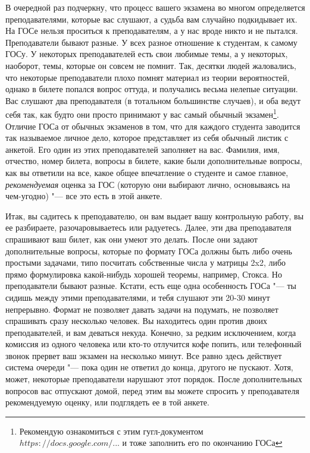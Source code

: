 В очередной раз подчеркну, что процесс вашего экзамена во многом определяется преподавателями, которые вас слушают, а судьба вам случайно подкидывает их. На ГОСе нельзя проситься к преподавателям, а у нас вроде никто и не пытался. Преподаватели бывают разные. У всех разное отношение к студентам, к самому ГОСу. У некоторых преподавателей есть свои любимые темы, а у некоторых, наоборот, темы, которые он совсем не помнит. Так, десятки людей жаловались, что некоторые преподаватели плохо помнят материал из теории вероятностей, однако в билете попался вопрос оттуда, и получались весьма нелепые ситуации. Вас слушают два преподавателя (в тотальном большинстве случаев), и оба ведут себя так, как будто они просто принимают у вас самый обычный экзамен\footnote{Рекомендую ознакомиться с этим гугл-документом \href{https://docs.google.com/spreadsheets/d/10jIg9Nr5oM1-Zjo_iIlKs8uxrBKrzfuJNas_YJIIxPs/edit\#gid=0}{$https://docs.google.com/...$} и тоже заполнить его по окончанию ГОСа}. Отличие ГОСа от обычных экзаменов в том, что для каждого студента заводится так называемое личное дело, которое представляет из себя обычный листик с анкетой. Его один из этих преподавателей заполняет на вас. Фамилия, имя, отчество, номер билета, вопросы в билете, какие были дополнительные вопросы, как вы ответили на все, какое общее впечатление о студенте и самое главное, \textit{рекомендуемая} оценка за ГОС (которую они выбирают лично, основываясь на чем-угодно) "--- все это есть в этой анкете. 

Итак, вы садитесь к преподавателю, он вам выдает вашу контрольную работу, вы ее разбираете, разочаровываетесь или радуетесь. Далее, эти два преподавателя спрашивают ваш билет, как они умеют это делать. После они задают дополнительные вопросы, которые по формату ГОСа должны быть либо очень простыми задачами, типо посчитать собственные числа у матрицы 2x2, либо прямо формулировка какой-нибудь хорошей теоремы, например, Стокса. Но преподаватели бывают разные. Кстати, есть еще одна особенность ГОСа "--- ты сидишь между этими преподавателями, и тебя слушают эти 20-30 минут непрерывно. Формат не позволяет давать задачи на подумать, не позволяет спрашивать сразу несколько человек. Вы находитесь один против двоих преподавателей, и вам деваться некуда. Конечно, за редким исключением, когда комиссия из одного человека или кто-то отлучится кофе попить, или телефонный звонок прервет ваш экзамен на несколько минут. Все равно здесь действует система очереди "--- пока один не ответил до конца, другого не пускают. Хотя, может, некоторые преподаватели нарушают этот порядок. После дополнительных вопросов вас отпускают домой, перед этим вы можете спросить у преподавателя рекомендуемую оценку, или подглядеть ее в той анкете.

